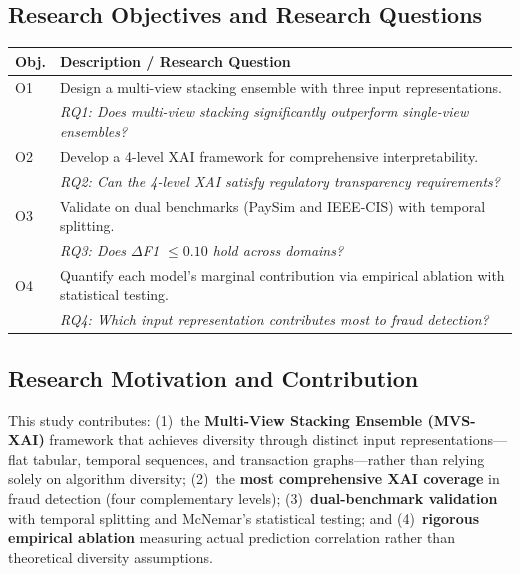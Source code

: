 \documentclass[10pt,a4paper,twocolumn]{article}
\begin{document}
\subsection{Research Objectives and Research Questions}

\begin{table}[H]
\centering
{\small
\begin{tabularx}{\columnwidth}{@{}lX@{}}
\toprule
\textbf{Obj.} & \textbf{Description / Research Question} \\
\midrule
O1 & Design a multi-view stacking ensemble with three input representations. \\
   & \textit{RQ1: Does multi-view stacking significantly outperform single-view ensembles?} \\[2pt]
O2 & Develop a 4-level XAI framework for comprehensive interpretability. \\
   & \textit{RQ2: Can the 4-level XAI satisfy regulatory transparency requirements?} \\[2pt]
O3 & Validate on dual benchmarks (PaySim and IEEE-CIS) with temporal splitting. \\
   & \textit{RQ3: Does $\Delta$F1 $\leq 0.10$ hold across domains?} \\[2pt]
O4 & Quantify each model's marginal contribution via empirical ablation with statistical testing. \\
   & \textit{RQ4: Which input representation contributes most to fraud detection?} \\
\bottomrule
\end{tabularx}
}
\end{table}

\subsection{Research Motivation and Contribution}

This study contributes: (1)~the \textbf{Multi-View Stacking Ensemble (MVS-XAI)} framework that achieves diversity through distinct input representations---flat tabular, temporal sequences, and transaction graphs---rather than relying solely on algorithm diversity; (2)~the \textbf{most comprehensive XAI coverage} in fraud detection (four complementary levels); (3)~\textbf{dual-benchmark validation} with temporal splitting and McNemar's statistical testing; and (4)~\textbf{rigorous empirical ablation} measuring actual prediction correlation rather than theoretical diversity assumptions.

\end{document}
